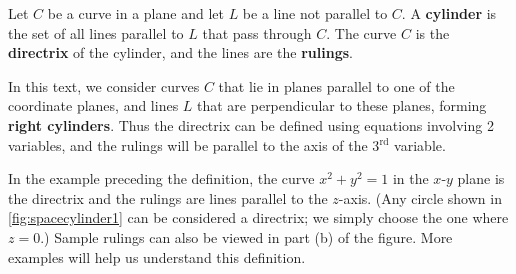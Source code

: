 
\begin{definition}[Cylinder]\label{def:cylinder}%
Let $C$ be a curve in a plane and let $L$ be a line not parallel to $C$. A \textbf{cylinder} is the set of all lines parallel to $L$ that pass through $C$. The curve $C$ is the \textbf{directrix} of the cylinder, and the lines are the \textbf{rulings}.
\end{definition}

In this text, we consider curves $C$ that lie in planes parallel to one of the coordinate planes, and lines $L$ that are perpendicular to these planes, forming \textbf{right cylinders}. Thus the directrix can be defined using equations involving 2 variables, and the rulings will be parallel to the axis of the 3$^\text{rd}$ variable.

In the example preceding the definition, the curve $x^2+y^2=1$ in the $x$-$y$ plane is the directrix and the rulings are lines parallel to the $z$-axis. (Any circle shown in \autoref{fig:spacecylinder1} can be considered a directrix; we simply choose the one where $z=0$.) Sample rulings can also be viewed in part (b) of the figure. More examples will help us understand this definition.


